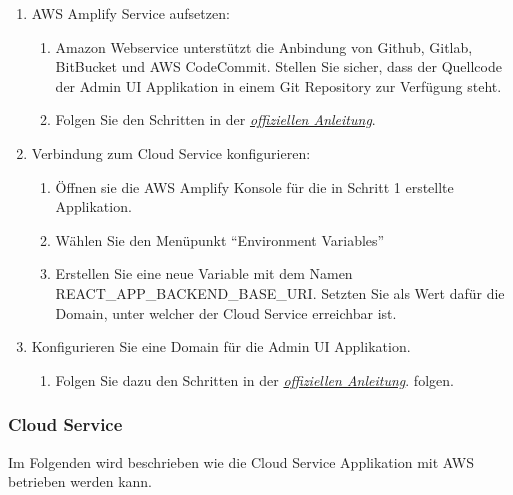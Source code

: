 \begin{enumerate}
    \item AWS Amplify Service aufsetzen:
    \begin{enumerate}
        \item Amazon Webservice unterstützt die Anbindung von Github, Gitlab, BitBucket und AWS CodeCommit. Stellen Sie sicher, dass der Quellcode der Admin UI Applikation in einem Git Repository zur Verfügung steht.
        \item Folgen Sie den Schritten in der \href{https://docs.aws.amazon.com/amplify/latest/userguide/getting-started.html}{\textit{offiziellen Anleitung}}.\cite{aws-amplify}
    \end{enumerate}
    \item Verbindung zum Cloud Service konfigurieren:
    \begin{enumerate}
        \item Öffnen sie die AWS Amplify Konsole für die in Schritt 1 erstellte Applikation.
        \item Wählen Sie den Menüpunkt ``Environment Variables''
        \item Erstellen Sie eine neue Variable mit dem Namen REACT\_APP\_BACKEND\_BASE\_URI. Setzten Sie als Wert dafür die Domain, unter welcher der Cloud Service erreichbar ist.
    \end{enumerate}
    \item Konfigurieren Sie eine Domain für die Admin UI Applikation.
    \begin{enumerate}
        \item Folgen Sie dazu den Schritten in der \href{https://docs.aws.amazon.com/amplify/latest/userguide/custom-domains.html}{\textit{offiziellen Anleitung}}.\cite{aws-amplify-domain} folgen.
    \end{enumerate}
\end{enumerate}

\subsubsection*{Cloud Service}

Im Folgenden wird beschrieben wie die Cloud Service Applikation mit AWS betrieben werden kann.

